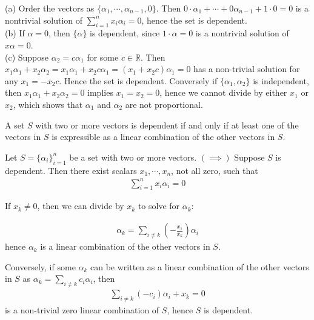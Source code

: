 \documentclass[12pt,letterpaper,reqno]{article}
\numberwithin{equation}{section}
\begin{document}
\begin{pf}
(a) Order the vectors as $\{\alpha_1,\cdots,\alpha_{n-1},0\}$. Then $0 \cdot \alpha_1 + \cdots + 0\alpha_{n-1}+1\cdot 0=0$ is a nontrivial solution of $\sum_{i=1}^nx_i\alpha_i=0$, hence the set is dependent. \\
(b) If $\alpha =0$, then $\{\alpha \}$ is dependent, since $1 \cdot \alpha=0$ is a nontrivial solution of $x\alpha=0$. \\
(c) Suppose $\alpha_2=c\alpha_1$ for some $c \in \mathbb{R}$. Then $x_1\alpha_1+x_2\alpha_2=x_1\alpha_1+x_2c\alpha_1=(x_1+x_2c)\alpha_1=0$ has a non-trivial solution for any $x_1=-x_2c$. Hence the set is dependent. Conversely if $\{\alpha_1,\alpha_2\}$ is independent, then $x_1\alpha_1+x_2\alpha_2=0$ implies $x_1=x_2=0$, hence we cannot divide by either $x_1$ or $x_2$, which shows that $\alpha_1$ and $\alpha_2$ are not proportional.	
\end{pf}

\begin{thm}
A set $S$ with two or more vectors is dependent if and only if at least one of the vectors in $S$ is expressible as a linear combination of the other vectors in $S$. 
\end{thm}

\begin{pf}
	Let $S=\{\alpha_i\}_{i=1}^n$ be a set with two or more vectors. $(\implies)$ Suppose $S$ is dependent. Then there exist scalars $x_1,\cdots,x_n$, not all zero, such that
		\begin{align*}
			\sum_{i=1}^n x_i\alpha_i=0	
		\end{align*}
		
	If $x_k \neq 0$, then we can divide by $x_k$ to solve for $\alpha_k$:
	
	\begin{align*}
		\alpha_k=\sum_{i \neq k}(-\frac{x_1}{x_k})\alpha_i
	\end{align*}
	hence $\alpha_k$ is a linear combination of the other vectors in $S$.
	
	Conversely, if some $\alpha_k$ can be written as a linear combination of the other vectors in $S$ as $\alpha_k=\sum_{i \neq k}c_i\alpha_i$, then 
	\begin{align*}
		\sum_{i \neq k}(-c_i)\alpha_i+x_k=0
	\end{align*}
	is a non-trivial zero linear combination of $S$, hence $S$ is dependent.


\end{pf}
\end{document}
